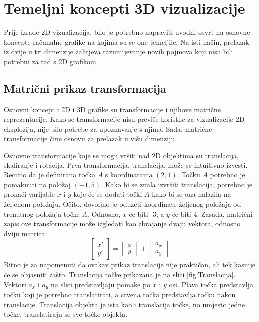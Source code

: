 \documentclass{foi}
\begin{document}
\chapter{Temeljni koncepti 3D vizualizacije}
Prije izrade 2D vizualizacija, bilo je potrebno napraviti uvodni osvrt na osnovne koncepte računalne grafike na kojima su se one temeljile. Na isti način, prelazak iz dvije u tri dimenzije zahtjeva razumijevanje novih pojmova koji nisu bili potrebni za rad s 2D grafikom.  

\section{Matrični prikaz transformacija}
Osnovni koncept i 2D i 3D grafike su transformacije i njihove matrične reprezentacije. Kako se transformacije nisu previše koristile za vizualizacije 2D eksplozija, nije bilo potrebe za upoznavanje s njima. Sada, matrične transformacije čine osnovu za prelazak u višu dimenziju.

Osnovne transformacije koje se mogu vršiti nad 2D objektima su translacija, skaliranje i rotacija. Prva transformacija, translacija, može se intuitivno izvesti. Recimo da je definirana točka $A$ s koordinatama $(2, 1)$. Točku $A$ potrebno je pomaknuti na položaj $(-1, 5)$. Kako bi se znala izvršiti translacija, potrebno je pronaći varijable $x$ i $y$ koje će se dodati točki $A$ kako bi se ona nalazila na željenom položaju. Očito, dovoljno je oduzeti koordinate željenog položaja od trenutnog položaja točke $A$. Odnosno, $x$ će biti -3, a $y$ će biti 4. Zasada, matrični zapis ove transformacije može izgledati kao zbrajanje dvaju vektora, odnosno dviju matrica:
\[
\begin{bmatrix}
x'\\
y' 
\end{bmatrix}
=
\begin{bmatrix}
x\\
y
\end{bmatrix}
+
\begin{bmatrix}
a_x\\
a_y
\end{bmatrix}
\]
Bitno je za napomenuti da ovakav prikaz translacije nije praktičan, ali tek kasnije će se objasniti zašto. Translacija točke prikazana je na slici \ref{fig:Translacija}. Vektori $a_x$ i $a_y$ na slici predstavljaju pomake po $x$ i $y$ osi. Plava točka predstavlja točku koji je potrebno translatirati, a crvena točka predstavlja točku nakon translacije. Translacija objekta je ista kao i translacija točke, no umjesto jedne točke, translatiraju se sve točke objekta. 
\end{document}
